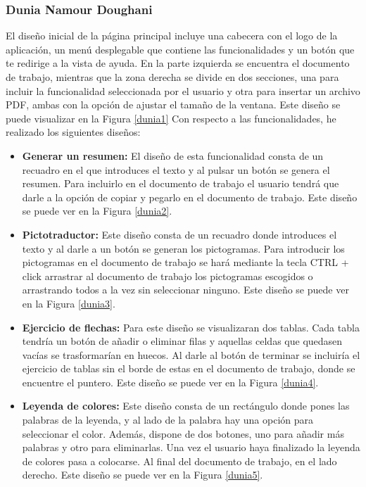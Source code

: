 \subsubsection{Dunia Namour Doughani}
\label{sec:duniaIter}
El diseño inicial de la página principal incluye una cabecera con el logo de la aplicación, un menú desplegable que contiene las funcionalidades y un botón que te redirige a la vista de ayuda. En la parte izquierda se encuentra el documento de trabajo, mientras que la zona derecha se divide en dos secciones, una para incluir la funcionalidad seleccionada por el usuario y otra para insertar un archivo PDF, ambas con la opción de ajustar el tamaño de la ventana. Este diseño se puede visualizar en la Figura \ref{dunia1} Con respecto a las funcionalidades, he realizado los siguientes diseños:
\begin{itemize}
  \item \textbf{Generar un resumen:} El diseño de esta funcionalidad consta de un recuadro en el que introduces el texto y al pulsar un botón se genera el resumen. Para incluirlo en el documento de trabajo el usuario tendrá que darle a la opción de copiar y pegarlo en el documento de trabajo. Este diseño se puede ver en la Figura \ref{dunia2}.
  \item \textbf{Pictotraductor:} Este diseño consta de un recuadro donde introduces el texto y al darle a un botón se generan los pictogramas. Para introducir los pictogramas en el documento de trabajo se hará mediante la tecla CTRL + click arrastrar al documento de trabajo los pictogramas escogidos o arrastrando todos a la vez sin seleccionar ninguno. Este diseño se puede ver en la Figura \ref{dunia3}.
  \item \textbf{Ejercicio de flechas:} Para este diseño se visualizaran dos tablas. Cada tabla tendría un botón de añadir o eliminar filas y aquellas celdas que quedasen vacías se trasformarían en huecos. Al darle al botón de terminar se incluiría el ejercicio de tablas sin el borde de estas en el documento de trabajo, donde se encuentre el puntero. Este diseño se puede ver en la Figura \ref{dunia4}.
  \item  \textbf{Leyenda de colores:} Este diseño consta de un rectángulo donde pones las palabras de la leyenda, y al lado de la palabra hay una opción para seleccionar el color. Además, dispone de dos botones, uno para añadir más palabras y otro para eliminarlas. Una vez el usuario haya finalizado la leyenda de colores pasa a colocarse. Al final del documento de trabajo, en el lado derecho. Este diseño se puede ver en la Figura \ref{dunia5}.

\end{itemize}
